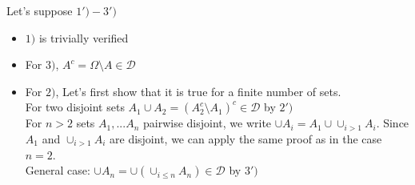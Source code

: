 \documentclass[12pt]{article}
\begin{document}
Let's suppose $1')-3')$
\begin{itemize}
\item $1)$ is trivially verified
\item For $3)$, $A^c = \Omega \setminus A \in \mathcal{D}$
\item For $2)$, Let's first show that it is true for a finite number of sets.\\
For two disjoint sets $A_1 \cup A_2 = (A_2^c \setminus A_1)^c \in \mathcal{D} $ by $2')$\\
For $n > 2$ sets $A_1, ... A_n$ pairwise disjoint, we write $\cup  A_i = A_1 \cup \cup_{i>1} A_i$. Since $A_1$ and $\cup_{i>1} A_i$ are disjoint, we can apply the same proof as in the case $n=2$.\\
General case:
$\cup A_n = \cup (\cup_{i \leq n} A_n) \in \mathcal{D}$ by $3')$
\end{itemize}
\end{document}
